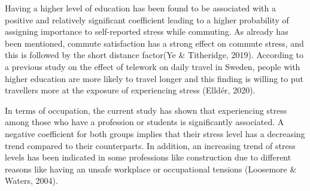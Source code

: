 \documentclass[
11pt, %
oneside, %
english, %
singlespacing, %
]{macthesis} %
\begin{document}
Having a higher level of education has been found to be associated with a positive and relatively significant coefficient leading to a higher probability of assigning importance to self-reported stress while commuting. As already has been mentioned, commute satisfaction has a strong effect on commute stress, and this is followed by the short distance factor(Ye \& Titheridge, 2019). According to a previous study on the effect of telework on daily travel in Sweden, people with higher education are more likely to travel longer and this finding is willing to put travellers more at the exposure of experiencing stress (Elldér, 2020).

In terms of occupation, the current study has shown that experiencing stress among those who have a profession or students is significantly associated. A negative coefficient for both groups implies that their stress level has a decreasing trend compared to their counterparts. In addition, an increasing trend of stress levels has been indicated in some professions like construction due to different reasons like having an unsafe workplace or occupational tensions (Loosemore \& Waters, 2004).
\end{document}
